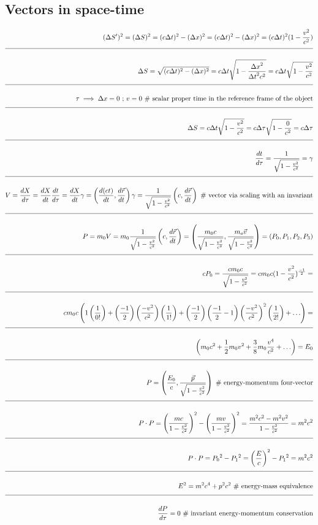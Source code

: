 \documentclass[a4paper]{article}
\newcommand{\eqComment}[1]{\text{  \# #1}}
\newcommand{\eqSep}{\text{ ;  }}
\newcommand{\n}{\\[1.5ex] \hline \nonumber \\[0ex]}
\begin{document}
\subsection{Vectors in space-time}
\begin{tcolorbox}
\begin{align}
   (\Delta S^\prime)^2 = (\Delta S)^2 = (c \Delta t)^2 - (\Delta x)^2 = (c \Delta t)^2 - (\Delta x)^2 = (c \Delta t)^2 (1 - \frac{v^2}{c^2})
\n \Delta S = \sqrt{(c \Delta t)^2 - (\Delta x)^2} = c \Delta t \sqrt{1 - \frac{{\Delta x}^2}{{\Delta t}^2 c^2}} = c \Delta t \sqrt{1 - \frac{v^2}{c^2}}
\n \tau \implies \Delta x = 0 \eqSep v = 0 \eqComment{scalar proper time in the reference frame of the object}
\n \Delta S = c \Delta t \sqrt{1 - \frac{v^2}{c^2}} = c \Delta \tau \sqrt{1 - \frac{0}{c^2}} = c \Delta \tau
\n \frac{dt}{d\tau} = \frac{1}{\sqrt{1 - \frac{v^2}{c^2}}} = \gamma
\n V = \frac{dX}{d\tau} = \frac{dX}{dt} \frac{dt}{d\tau} = \frac{dX}{dt} \gamma = \left(\frac{d(ct)}{dt}, \frac{d\vec{r}}{dt}\right) \gamma = \frac{1}{\sqrt{1 - \frac{v^2}{c^2}}} \left(c, \frac{d\vec{r}}{dt}\right) \eqComment{vector via scaling with an invariant}
\n P = m_0 V = m_0 \frac{1}{\sqrt{1 - \frac{v^2}{c^2}}} \left(c, \frac{d\vec{r}}{dt}\right) = \left(\frac{m_0 c}{\sqrt{1 - \frac{v^2}{c^2}}}, \frac{m_o \vec{v}}{\sqrt{1 - \frac{v^2}{c^2}}}\right) = (P_0, P_1, P_2, P_3)
\n c P_0 = \frac{c m_0 c}{\sqrt{1 - \frac{v^2}{c^2}}} =  c m_0 c (1 - \frac{v^2}{c^2})^{\frac{-1}{2}} =
\n c m_0 c \left(1 \left(\frac{1}{0!}\right) + \left(\frac{-1}{2}\right) \left(\frac{-v^2}{c^2}\right) \left(\frac{1}{1!}\right) + \left(\frac{-1}{2}\right) \left(\frac{-1}{2} - 1\right) \left(\frac{-v^2}{c^2}\right)^2 \left(\frac{1}{2!}\right) + \ldots \right) =
\n \left(m_0 c^2 +\frac{1}{2} m_0 v^2 + \frac{3}{8} m_0 \frac{v^4}{c^2} + \ldots \right) = E_0
\n P = \left(\frac{E_0}{c}, \frac{\vec{p}}{\sqrt{1 - \frac{v^2}{c^2}}}\right) \eqComment{energy-momentum four-vector}
\n P \cdot P = \left(\frac{m c}{1 - \frac{v^2}{c^2}}\right)^2 - \left(\frac{m v}{1 - \frac{v^2}{c^2}}\right)^2 = \frac{m^2 c^2 - m^2 v^2}{1 - \frac{v^2}{c^2}} = m^2 c^2
\n P \cdot P = {P_0}^2 - {P_1}^2 = \left(\frac{E}{c}\right)^2 - {P_1}^2 = m^2 c^2
\n E^2 = m^2 c^4 + p^2 c^2 \eqComment{energy-mass equivalence}
\n \frac{d P}{d \tau} = 0 \eqComment{invariant energy-momentum conservation}
\end{align}
\end{tcolorbox}
\end{document}
